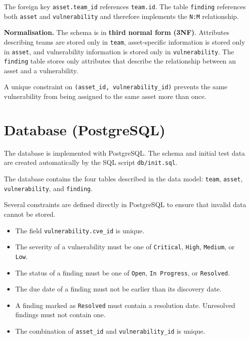 \documentclass[11pt,a4paper]{article}
\begin{document}
The foreign key \texttt{asset.team\_id} references \texttt{team.id}.
The table \texttt{finding} references both \texttt{asset} and
\texttt{vulnerability} and therefore implements the \texttt{N:M}
relationship.

\textbf{Normalisation.}
The schema is in \textbf{third normal form (3NF)}. Attributes describing teams
are stored only in \texttt{team}, asset-specific information is stored only in
\texttt{asset}, and vulnerability information is stored only in
\texttt{vulnerability}. The \texttt{finding} table stores only attributes that
describe the relationship between an asset and a vulnerability.

A unique constraint on \texttt{(asset\_id, vulnerability\_id)} prevents the
same vulnerability from being assigned to the same asset more than once.

\section{Database (PostgreSQL)}

The database is implemented with PostgreSQL. The schema and initial test data
are created automatically by the SQL script \texttt{db/init.sql}.

The database contains the four tables described in the data model:
\texttt{team}, \texttt{asset}, \texttt{vulnerability}, and
\texttt{finding}.

Several constraints are defined directly in PostgreSQL to ensure that invalid
data cannot be stored.

\begin{itemize}[leftmargin=1.4em]
  \item The field \texttt{vulnerability.cve\_id} is unique.
  \item The severity of a vulnerability must be one of
        \texttt{Critical}, \texttt{High}, \texttt{Medium}, or \texttt{Low}.
  \item The status of a finding must be one of
        \texttt{Open}, \texttt{In Progress}, or \texttt{Resolved}.
  \item The due date of a finding must not be earlier than its discovery date.
  \item A finding marked as \texttt{Resolved} must contain a resolution date.
        Unresolved findings must not contain one.
  \item The combination of \texttt{asset\_id} and
        \texttt{vulnerability\_id} is unique.
\end{itemize}
\end{document}

